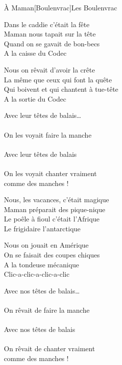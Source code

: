 \documentclass[a4paper,11pt,french]{article}
\begin{document}
\begin{Song}[A Maman]{À Maman}[Boulenvrac]{Les Boulenvrac}
\begin{multicols}{2}
\begin{Verse}
Dans le caddie c'était la fête\\
Maman nous tapait sur la tête\\
Quand on se gavait de bon-becs\\
A la caisse du Codec\\
\espaceInterStrophe

Nous on rêvait d'avoir la crête\\
La même que ceux qui font la quête\\
Qui boivent et qui chantent à tue-tête\\
A la sortie du Codec\\
\end{Verse}
\espaceInterStrophe

\begin{Chorus}
Avec leur têtes de balais…\\
\\
On les voyait faire la manche\\
\\
Avec leur têtes de balais\\
\\
On les voyait chanter vraiment\\
comme des manches !\\
\end{Chorus}
\espaceInterStrophe

\begin{Verse}
Nous, les vacances, c'était magique\\
Maman préparait des pique-nique\\
Le poêle à fioul c'était l'Afrique\\
Le frigidaire l'antarctique\\
\espaceInterStrophe

Nous on jouait en Amérique\\
On se faisait des coupes chiques\\
A la tondeuse mécanique\\
Clic-a-clic-a-clic-a-clic\\
\end{Verse}
\columnbreak

\begin{Chorus}
Avec nos têtes de balais…\\
\\
On rêvait de faire la manche\\
\\
Avec nos têtes de balais\\
\\
On rêvait de chanter vraiment\\
comme des manches !\\
\espaceInterStrophe


\end{Chorus}
\end{multicols}
\end{Song}
\end{document}
